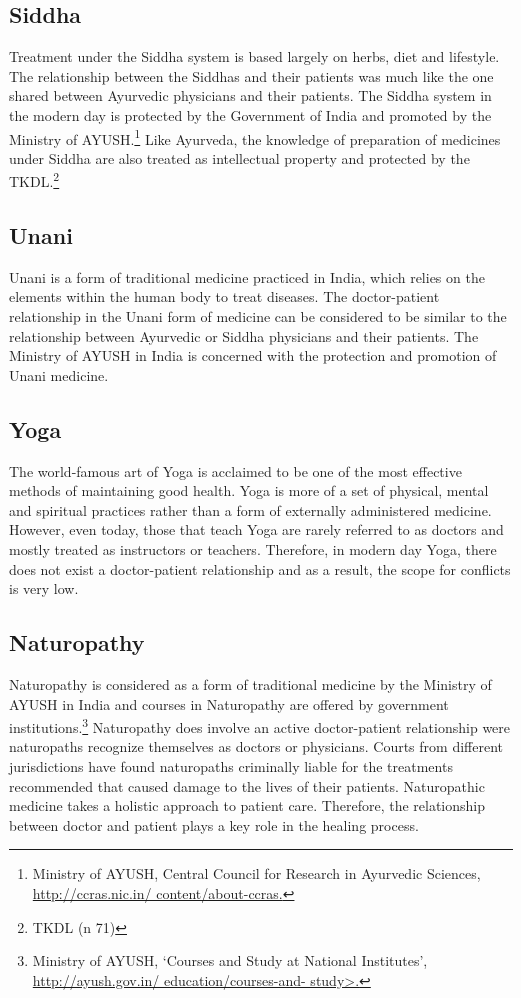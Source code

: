 \begin{multicols}{2}
\subsection*{Siddha}

\noi
Treatment under the Siddha system is based largely on herbs, diet and lifestyle. The relationship between the Siddhas and their patients was much like the one shared between Ayurvedic physicians and their patients. The Siddha system in the modern day is protected by the Government of India and promoted by the Ministry of AYUSH.\footnote{Ministry of AYUSH, Central Council for Research in Ayurvedic Sciences, \url{http://ccras.nic.in/ content/about-ccras.}} Like Ayurveda, the knowledge of preparation of medicines under Siddha are also treated as intellectual property and protected by the TKDL.\footnote{TKDL (n 71)}

\subsection*{Unani}

\noi
Unani is a form of traditional medicine practiced in India, which relies on the elements
within the human body to treat diseases. The doctor-patient relationship in the Unani
form of medicine can be considered to be similar to the relationship between Ayurvedic
or Siddha physicians and their patients. The Ministry of AYUSH in India is concerned
with the protection and promotion of Unani medicine.

\subsection*{Yoga}

\noi
The world-famous art of Yoga is acclaimed to be one of the most effective methods of
maintaining good health. Yoga is more of a set of physical, mental and spiritual practices
rather than a form of externally administered medicine. However, even today, those that
teach Yoga are rarely referred to as doctors and mostly treated as instructors or teachers.
Therefore, in modern day Yoga, there does not exist a doctor-patient relationship and
as a result, the scope for conflicts is very low.

\subsection*{Naturopathy}

\noi
Naturopathy is considered as a form of traditional medicine by the Ministry of AYUSH in India and courses in Naturopathy are offered by government institutions.\footnote{Ministry of AYUSH, ‘Courses and Study at National Institutes’, \url{http://ayush.gov.in/ education/courses-and- study>.}} Naturopathy does involve an active doctor-patient relationship were naturopaths recognize themselves as doctors or physicians. Courts from different jurisdictions have found naturopaths criminally liable for the treatments recommended that caused damage to the lives of their patients. Naturopathic medicine takes a holistic approach to patient care. Therefore, the relationship between doctor and patient plays a key role in the healing process.


\end{multicols}
